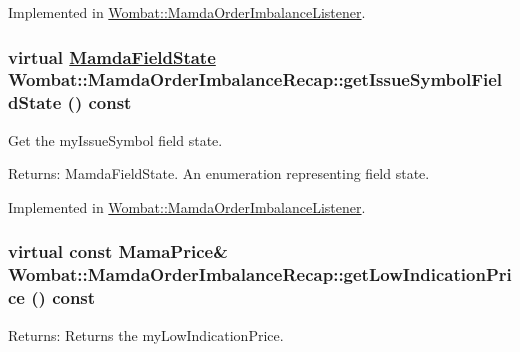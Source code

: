 Implemented in \hyperlink{classWombat_1_1MamdaOrderImbalanceListener_3cbc1356e4c8a1e6287aa4fd39124cbd}{Wombat::Mamda\-Order\-Imbalance\-Listener}.\hypertarget{classWombat_1_1MamdaOrderImbalanceRecap_955e7f821258342ee01c9d897f6c3d34}{
\subsubsection[getIssueSymbolFieldState]{\setlength{\rightskip}{0pt plus 5cm}virtual \hyperlink{namespaceWombat_93aac974f2ab713554fd12a1fa3b7d2a}{Mamda\-Field\-State} Wombat::Mamda\-Order\-Imbalance\-Recap::get\-Issue\-Symbol\-Field\-State () const}}
\label{classWombat_1_1MamdaOrderImbalanceRecap_955e7f821258342ee01c9d897f6c3d34}


Get the my\-Issue\-Symbol field state. 

\begin{Desc}
\item[Returns:]Mamda\-Field\-State. An enumeration representing field state. \end{Desc}


Implemented in \hyperlink{classWombat_1_1MamdaOrderImbalanceListener_e65164421eb2d6835ada9d3185734021}{Wombat::Mamda\-Order\-Imbalance\-Listener}.\hypertarget{classWombat_1_1MamdaOrderImbalanceRecap_b5dda63ec532e8d11a6a07a380d5470f}{
\subsubsection[getLowIndicationPrice]{\setlength{\rightskip}{0pt plus 5cm}virtual const Mama\-Price\& Wombat::Mamda\-Order\-Imbalance\-Recap::get\-Low\-Indication\-Price () const}}
\label{classWombat_1_1MamdaOrderImbalanceRecap_b5dda63ec532e8d11a6a07a380d5470f}


\begin{Desc}
\item[Returns:]Returns the my\-Low\-Indication\-Price. \end{Desc}


